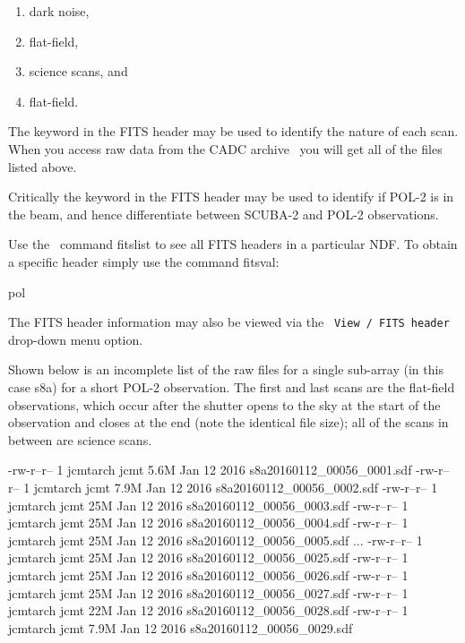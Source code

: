 \begin{enumerate}\itemsep-0.2em
\item dark noise,
\item flat-field,
\item science scans, and
\item flat-field.
\end{enumerate}


The  keyword in the FITS header may be used to
identify the nature of each scan.  When you access raw data from the
CADC archive
\
you will get all of the files listed above.


Critically the  keyword in the FITS header may be used
to identify if POL-2 is in the beam, and hence differentiate between
SCUBA-2 and POL-2 observations.


\begin{tip}
  Use the \Kappa\ command fitslist to see all FITS headers in a
  particular NDF. To obtain a specific header simply use the command
  fitsval:
  \begin{terminalv}
pol
\end{terminalv}
The FITS header information may also be viewed via the \gaia\
\texttt{View / FITS header} drop-down menu option.
\end{tip}

Shown below is an incomplete list of the raw files for a single
sub-array (in this case s8a) for a short POL-2 observation. The first
and last scans are the flat-field observations, which occur after the
shutter opens to the sky at the start of the observation and closes at
the end (note the identical file size); all of the scans in between
are science scans.


\begin{terminalv}
\end{terminalv}

\begin{terminalv}
-rw-r--r-- 1 jcmtarch jcmt 5.6M Jan 12  2016 s8a20160112_00056_0001.sdf
-rw-r--r-- 1 jcmtarch jcmt 7.9M Jan 12  2016 s8a20160112_00056_0002.sdf
-rw-r--r-- 1 jcmtarch jcmt  25M Jan 12  2016 s8a20160112_00056_0003.sdf
-rw-r--r-- 1 jcmtarch jcmt  25M Jan 12  2016 s8a20160112_00056_0004.sdf
-rw-r--r-- 1 jcmtarch jcmt  25M Jan 12  2016 s8a20160112_00056_0005.sdf
...
-rw-r--r-- 1 jcmtarch jcmt  25M Jan 12  2016 s8a20160112_00056_0025.sdf
-rw-r--r-- 1 jcmtarch jcmt  25M Jan 12  2016 s8a20160112_00056_0026.sdf
-rw-r--r-- 1 jcmtarch jcmt  25M Jan 12  2016 s8a20160112_00056_0027.sdf
-rw-r--r-- 1 jcmtarch jcmt  22M Jan 12  2016 s8a20160112_00056_0028.sdf
-rw-r--r-- 1 jcmtarch jcmt 7.9M Jan 12  2016 s8a20160112_00056_0029.sdf
\end{terminalv}

